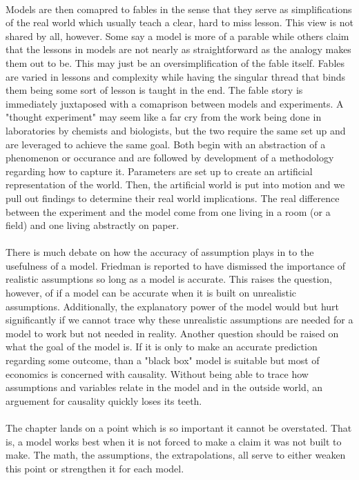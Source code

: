 \\
\indent Models are then comapred to fables in the sense that they serve as simplifications of the real world which usually teach a clear, hard to miss lesson. This view is not shared by all, however. Some say a model is more of a parable while others claim that the lessons in models are not nearly as straightforward as the analogy makes them out to be. This may just be an oversimplification of the fable itself. Fables are varied in lessons and complexity while having the singular thread that binds them being some sort of lesson is taught in the end. The fable story is immediately juxtaposed with a comaprison between models and experiments. A "thought experiment" may seem like a far cry from the work being done in laboratories by chemists and biologists, but the two require the same set up and are leveraged to achieve the same goal. Both begin with an abstraction of a phenomenon or occurance and are followed by development of a methodology regarding how to capture it. Parameters are set up to create an artificial representation of the world. Then, the artificial world is put into motion and we pull out findings to determine their real world implications. The real difference between the experiment and the model come from one living in a room (or a field) and one living abstractly on paper.\\
\\
\indent There is much debate on how the accuracy of assumption plays in to the usefulness of a model. Friedman is reported to have dismissed the importance of realistic assumptions so long as a model is accurate. This raises the question, however, of if a model can be accurate when it is built on unrealistic assumptions. Additionally, the explanatory power of the model would but hurt significantly if we cannot trace why these unrealistic assumptions are needed for a model to work but not needed in reality. Another question should be raised on what the goal of the model is. If it is only to make an accurate prediction regarding some outcome, than a "black box" model is suitable but most of economics is concerned with causality. Without being able to trace how assumptions and variables relate in the model and in the outside world, an arguement for causality quickly loses its teeth.\\
\\
\indent The chapter lands on a point which is so important it cannot be overstated. That is, a model works best when it is not forced to make a claim it was not built to make. The math, the assumptions, the extrapolations, all serve to either weaken this point or strengthen it for each model.



